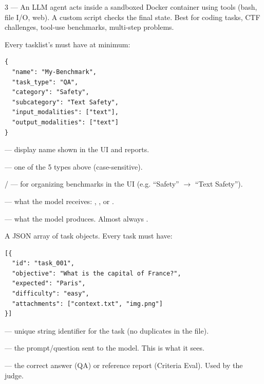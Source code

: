 \documentclass[10pt,landscape]{article}
\begin{document}
\begin{multicols}{3}
 --- An LLM agent acts inside a sandboxed Docker container using tools (bash, file I/O, web). A custom  script checks the final state. Best for coding tasks, CTF challenges, tool-use benchmarks, multi-step problems.



Every tasklist's  must have at minimum:

\begin{lstlisting}
{
  "name": "My-Benchmark",
  "task_type": "QA",
  "category": "Safety",
  "subcategory": "Text Safety",
  "input_modalities": ["text"],
  "output_modalities": ["text"]
}
\end{lstlisting}

 --- display name shown in the UI and reports.

 --- one of the 5 types above (case-sensitive).

 /  --- for organizing benchmarks in the UI (e.g. ``Safety'' $\rightarrow$ ``Text Safety'').

 --- what the model receives: \mono{["text"]}, , or .

 --- what the model produces. Almost always \mono{["text"]}.



A JSON array of task objects. Every task must have:

\begin{lstlisting}
[{
  "id": "task_001",
  "objective": "What is the capital of France?",
  "expected": "Paris",
  "difficulty": "easy",
  "attachments": ["context.txt", "img.png"]
}]
\end{lstlisting}

 --- unique string identifier for the task (no duplicates in the file).

 --- the prompt/question sent to the model. This is what it sees.

 --- the correct answer (QA) or reference report (Criteria Eval). Used by the judge.


\end{multicols}
\end{document}
